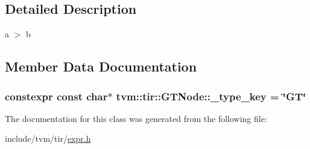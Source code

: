 \subsection{Detailed Description}
a $>$ b 

\subsection{Member Data Documentation}
\subsubsection[{\texorpdfstring{\+\_\+type\+\_\+key}{_type_key}}]{\setlength{\rightskip}{0pt plus 5cm}constexpr const char$\ast$ tvm\+::tir\+::\+G\+T\+Node\+::\+\_\+type\+\_\+key = \char`\"{}GT\char`\"{}\hspace{0.3cm}{\ttfamily [static]}}\hypertarget{classtvm_1_1tir_1_1GTNode_a41075d54e53c15536c8ef7bee423b895}{}\label{classtvm_1_1tir_1_1GTNode_a41075d54e53c15536c8ef7bee423b895}


The documentation for this class was generated from the following file\+:\begin{DoxyCompactItemize}
\item 
include/tvm/tir/\hyperlink{tir_2expr_8h}{expr.\+h}\end{DoxyCompactItemize}
